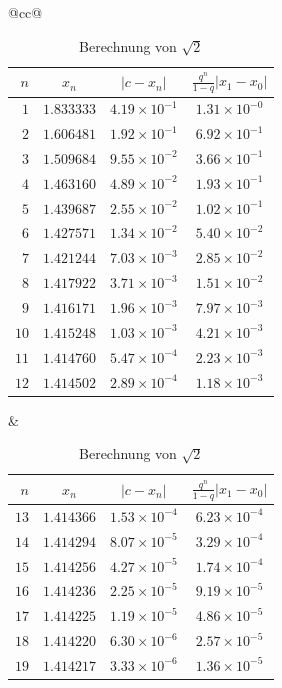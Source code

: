 \documentclass[
  a4paper, 11pt, fleqn, twoside,
  abstract=true
]{scrartcl}
\theoremstyle{plain}
\theoremstyle{definition}
\begin{document}
\begin{table}
\begin{center}
\caption{Berechnung von $\sqrt{2}$}\label{tab:Berechnung}
\begin{tabular}{@{}cc@{}}
\begin{tabular}{rccc}
\toprule
$n$ & $x_n$ & $|c-x_n|$ & $\frac{q^n}{1-q}|x_1-x_0|$\\
\midrule
$ 1$ & $1.833333$ & $4.19\times 10^{-1}$ & $1.31\times 10^{-0}$\\
$ 2$ & $1.606481$ & $1.92\times 10^{-1}$ & $6.92\times 10^{-1}$\\
$ 3$ & $1.509684$ & $9.55\times 10^{-2}$ & $3.66\times 10^{-1}$\\
$ 4$ & $1.463160$ & $4.89\times 10^{-2}$ & $1.93\times 10^{-1}$\\
\midrule
$ 5$ & $1.439687$ & $2.55\times 10^{-2}$ & $1.02\times 10^{-1}$\\
$ 6$ & $1.427571$ & $1.34\times 10^{-2}$ & $5.40\times 10^{-2}$\\
$ 7$ & $1.421244$ & $7.03\times 10^{-3}$ & $2.85\times 10^{-2}$\\
$ 8$ & $1.417922$ & $3.71\times 10^{-3}$ & $1.51\times 10^{-2}$\\
\midrule
$ 9$ & $1.416171$ & $1.96\times 10^{-3}$ & $7.97\times 10^{-3}$\\
$10$ & $1.415248$ & $1.03\times 10^{-3}$ & $4.21\times 10^{-3}$\\
$11$ & $1.414760$ & $5.47\times 10^{-4}$ & $2.23\times 10^{-3}$\\
$12$ & $1.414502$ & $2.89\times 10^{-4}$ & $1.18\times 10^{-3}$\\
\bottomrule
\end{tabular}
&
\begin{tabular}{rccc}
\toprule
$n$ & $x_n$ & $|c-x_n|$ & $\frac{q^n}{1-q}|x_1-x_0|$\\
\midrule
$13$ & $1.414366$ & $1.53\times 10^{-4}$ & $6.23\times 10^{-4}$\\
$14$ & $1.414294$ & $8.07\times 10^{-5}$ & $3.29\times 10^{-4}$\\
$15$ & $1.414256$ & $4.27\times 10^{-5}$ & $1.74\times 10^{-4}$\\
$16$ & $1.414236$ & $2.25\times 10^{-5}$ & $9.19\times 10^{-5}$\\
\midrule
$17$ & $1.414225$ & $1.19\times 10^{-5}$ & $4.86\times 10^{-5}$\\
$18$ & $1.414220$ & $6.30\times 10^{-6}$ & $2.57\times 10^{-5}$\\
$19$ & $1.414217$ & $3.33\times 10^{-6}$ & $1.36\times 10^{-5}$\\

\end{tabular}
\end{tabular}
\end{center}
\end{table}
\end{document}
